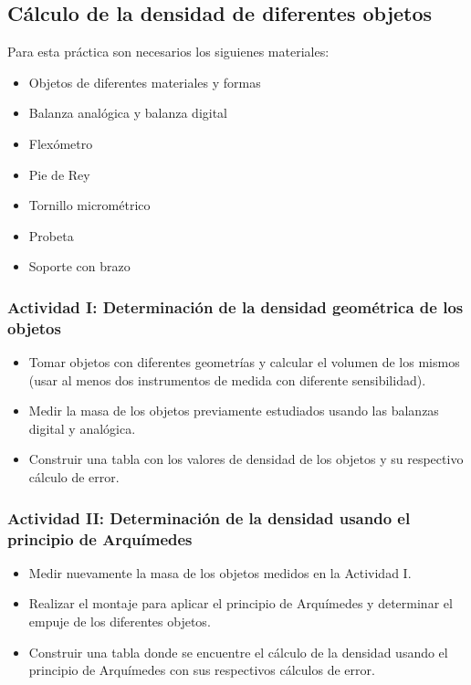\documentclass[12pt]{article}
\begin{document}

\subsection{Cálculo de la densidad de diferentes objetos}

Para esta práctica son necesarios los siguienes materiales:
\begin{itemize}
    \item Objetos de diferentes materiales y formas
    \item Balanza analógica y balanza digital
    \item Flexómetro
    \item Pie de Rey
    \item Tornillo micrométrico
    \item Probeta
    \item Soporte con brazo
\end{itemize}

\subsubsection{Actividad I: Determinación de la densidad geométrica de los objetos}

\begin{itemize}
    \item Tomar objetos con diferentes geometrías y calcular el volumen de los mismos (usar al menos dos instrumentos de medida con diferente sensibilidad).
    \item Medir la masa de los objetos previamente estudiados usando las balanzas digital y analógica.
    \item Construir una tabla con los valores de densidad de los objetos y su respectivo cálculo de error.
\end{itemize}

\subsubsection{Actividad II: Determinación de la densidad usando el principio de Arquímedes}

\begin{itemize}
    \item Medir nuevamente la masa de los objetos medidos en la Actividad I.
    \item Realizar el montaje para aplicar el principio de Arquímedes y determinar el empuje de los diferentes objetos.
    \item Construir una tabla donde se encuentre el cálculo de la densidad usando el principio de Arquímedes con sus respectivos cálculos de error.
\end{itemize}
\end{document}
